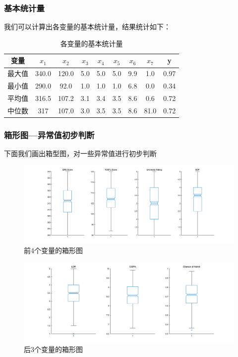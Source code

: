 \documentclass[11pt]{article}
\begin{document}
\subsubsection*{基本统计量}
我们可以计算出各变量的基本统计量，结果统计如下：
\begin{table}[H]
	\centering
	\caption{各变量的基本统计量}
	\begin{tabular}{ccccccccc}
		\hline\hline
		变量&$x_1$&$x_2$&$x_3$&$x_4$&$x_5$&$x_6$&$x_7$&y\\
		\hline
		最大值&340.0&120.0&5.0&5.0&5.0&9.9&1.0&0.97\\
		最小值&290.0&92.0&1.0&1.0&1.0&6.8&0.0&0.34\\
		平均值&316.5&107.2&3.1&3.4&3.5&8.6&0.6&0.72\\
		中位数&317&107.0&3.0&3.5&3.5&8.6&81.0&0.72\\
		\hline\hline
	\end{tabular}
\end{table}
\subsubsection*{箱形图---异常值初步判断}
下面我们画出箱型图，对一些异常值进行初步判断
\begin{figure}[H]
	\centering
	\caption{前4个变量的箱形图}
	\includegraphics[scale=0.35]{images/boxplot1.png}
\end{figure}
\begin{figure}[H]
	\centering
	\caption{后3个变量的箱形图}
	\includegraphics[scale=0.35]{images/boxplot2.png}
\end{figure}
\end{document}
